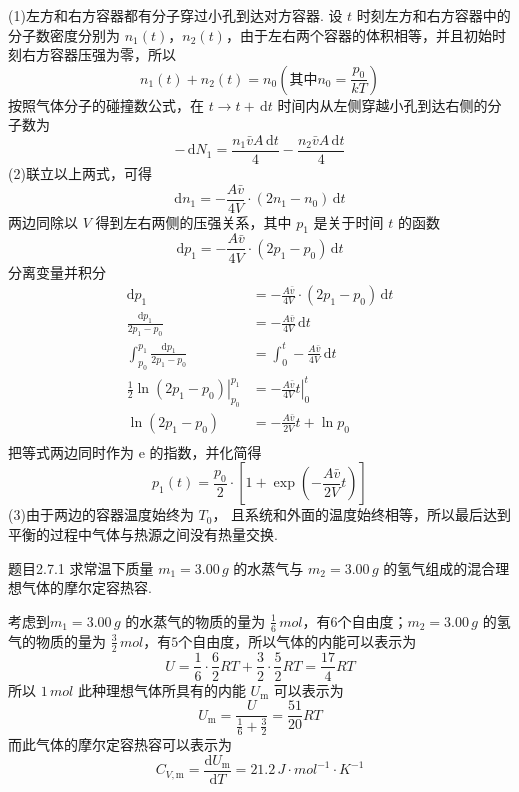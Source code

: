 \begin{solution}
    (1)左方和右方容器都有分子穿过小孔到达对方容器. 设 $t$ 时刻左方和右方容器中的分子数密度分别为 $n_1(t)$，$n_2(t)$，由于左右两个容器的体积相等，并且初始时刻右方容器压强为零，所以
    $$
        n_1(t) + n_2(t) = n_0 \left( \text{其中} n_0 = \frac{p_0}{kT} \right)
    $$
    按照气体分子的碰撞数公式，在 $t \to t+\,\mathrm{d}t$ 时间内从左侧穿越小孔到达右侧的分子数为
    $$
        -\,\mathrm{d}N_1 = \frac{n_1\bar{v}A\,\mathrm{d}t}{4} - \frac{n_2\bar{v}A\,\mathrm{d}t}{4}
    $$
    (2)联立以上两式，可得
    $$
        \mathrm{d}n_1 = -\frac{A\bar{v}}{4V} \cdot \left(2n_1 - n_0\right) \,\mathrm{d}t
    $$
    两边同除以 $V$ 得到左右两侧的压强关系，其中 $p_1$ 是关于时间 $t$ 的函数
    $$
        \mathrm{d} p_1 = -\frac{A\bar{v}}{4V} \cdot (2p_1 - p_0) \,\mathrm{d}t
    $$
    分离变量并积分
    $$
        \begin{aligned}
            \mathrm{d}p_1                                          & = -\frac{A\bar{v}}{4V} \cdot (2p_1 - p_0) \,\mathrm{d}t \\
            \frac{\mathrm{d}p_1}{2p_1 - p_0}                       & = -\frac{A\bar{v}}{4V} \,\mathrm{d}t                    \\
            \int_{p_0}^{p_1} \frac{\mathrm{d}p_1}{2p_1 - p_0}      & = \int_0^t -\frac{A\bar{v}}{4V} \,\mathrm{d}t           \\
            \left. \frac{1}{2} \ln(2p_1 - p_0) \right|_{p_0}^{p_1} & = \left. -\frac{A\bar{v}}{4V} t \right|_0^t             \\
            \ln(2p_1 - p_0)                                        & = -\frac{A\bar{v}}{2V} t + \ln{p_0}                     \\
        \end{aligned}
    $$
    把等式两边同时作为 $\mathrm{e}$ 的指数，并化简得
    $$
        p_1(t) = \frac{p_0}{2} \cdot \left[1+\exp\left(-\frac{A\bar{v}}{2V}t\right) \right]
    $$
    (3)由于两边的容器温度始终为 $T_0$， 且系统和外面的温度始终相等，所以最后达到平衡的过程中气体与热源之间没有热量交换.
\end{solution}

\begin{question}{题目2.7.1}
    求常温下质量 $m_1 = 3.00 \,\si{g}$ 的水蒸气与 $m_2 = 3.00 \,\si{g}$ 的氢气组成的混合理想气体的摩尔定容热容.
\end{question}

\begin{solution}
    考虑到$m_1 = 3.00 \,\si{g}$ 的水蒸气的物质的量为 $\frac{1}{6} \,\si{mol}$，有$6$个自由度；$m_2 = 3.00 \,\si{g}$ 的氢气的物质的量为 $\frac{3}{2} \,\si{mol}$，有$5$个自由度，所以气体的内能可以表示为
    $$
        U = \frac{1}{6} \cdot \frac{6}{2}RT + \frac{3}{2} \cdot \frac{5}{2}RT
        = \frac{17}{4}RT
    $$
    所以 $1 \,\si{mol}$ 此种理想气体所具有的内能 $U_\mathrm{m}$ 可以表示为
    $$
        U_\mathrm{m} = \frac{U}{\frac{1}{6} + \frac{3}{2}} = \frac{51}{20}RT
    $$
    而此气体的摩尔定容热容可以表示为
    $$
        C_{V,\mathrm{m}}
        = \frac{\mathrm{d}U_\mathrm{m}}{\mathrm{d}T}
        = 21.2 \,\si{J \cdot mol^{-1} \cdot K^{-1}}
    $$
\end{solution}

